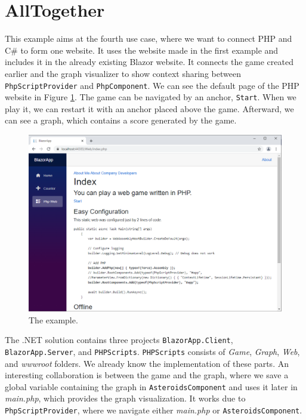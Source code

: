 \section{AllTogether}

This example aims at the fourth use case, where we want to connect PHP and C\# to form one website.
It uses the website made in the first example and includes it in the already existing Blazor website.
It connects the game created earlier and the graph visualizer to show context sharing between \texttt{PhpScriptProvider} and \texttt{PhpComponent}.
We can see the default page of the PHP website in Figure \ref{img30:allTogether}.
The game can be navigated by an anchor, \texttt{Start}.
When we play it, we can restart it with an anchor placed above the game.
Afterward, we can see a graph, which contains a score generated by the game. 
\par
\begin{figure}\centering
\includegraphics[scale=0.5]{./img/AllTogether}
\caption{The example.}
\label{img30:allTogether}
\end{figure} 
\par
The .NET solution contains three projects \texttt{BlazorApp.Client}, \texttt{BlazorApp.Server}, and \texttt{PHPScripts}.
\texttt{PHPScripts} consists of \textit{Game}, \textit{Graph}, \textit{Web}, and \textit{wwwroot} folders.
We already know the implementation of these parts.
An interesting collaboration is between the game and the graph, where we save a global variable containing the graph in \texttt{AsteroidsComponent} and uses it later in \textit{main.php}, which provides the graph visualization.
It works due to \texttt{PhpScriptProvider}, where we navigate either \textit{main.php} or \texttt{AsteroidsComponent}.
